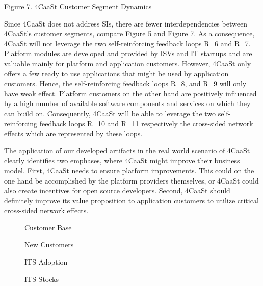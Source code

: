 Figure 7. 4CaaSt Customer Segment Dynamics

Since 4CaaSt does not address SIs, there are fewer interdependencies between 4CaaSt's customer segments, compare Figure 5 and Figure 7. As a consequence, 4CaaSt will not leverage the two self-reinforcing feedback loops R\_6 and R\_7. Platform modules are developed and provided by ISVs and IT startups and are valuable mainly for platform and application customers. However, 4CaaSt only offers a few ready to use applications that might be used by application customers. Hence, the self-reinforcing feedback loops R\_8, and R\_9 will only have weak effect. Platform customers on the other hand are positively influenced by a high number of available software components and services on which they can build on. Consequently, 4CaaSt will be able to leverage the two self-reinforcing feedback loops R\_10 and R\_11 respectively the cross-sided network effects which are represented by these loops. 

The application of our developed artifacts in the real world scenario of 4CaaSt clearly identifies two emphases, where 4CaaSt might improve their business model. First, 4CaaSt needs to ensure platform improvements. This could on the one hand be accomplished by the platform providers themselves, or 4CaaSt could also create incentives for open source developers. Second, 4CaaSt should definitely improve its value proposition to application customers to utilize critical cross-sided network effects.

\begin{figure}[t]
	\centering
	
	\caption{Customer Base}
	\label{fig:g:cb}
\end{figure}

\begin{figure}[t]
	\centering
	
	\caption{New Customers}
	\label{fig:g:nc}
\end{figure}

\begin{figure}[t]
	\centering
	
	\caption{ITS Adoption}
	\label{fig:g:itsa}
\end{figure}

\begin{figure}[t]
	\centering
	
	\caption{ITS Stocks}
	\label{fig:g:itss}
\end{figure}


